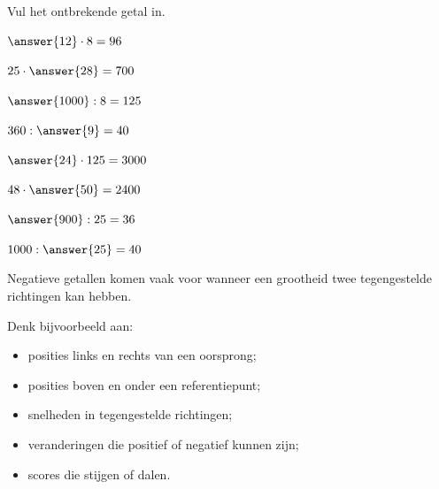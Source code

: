 \documentclass{ximera}
\begin{document}
\begin{oefening}{\oefU}

Vul het ontbrekende getal in.

\begin{question} \(\answer{12}\cdot8=96\) \end{question}

\begin{question} \(25\cdot\answer{28}=700\) \end{question}

\begin{question} \(\answer{1000}:8=125\) \end{question}

\begin{question} \(360:\answer{9}=40\) \end{question}

\begin{question} \(\answer{24}\cdot125=3000\) \end{question}

\begin{question} \(48\cdot\answer{50}=2400\) \end{question}

\begin{question} \(\answer{900}:25=36\) \end{question}

\begin{question} \(1000:\answer{25}=40\) \end{question}

\end{oefening}



Negatieve getallen komen vaak voor wanneer een grootheid twee tegengestelde
richtingen kan hebben.

Denk bijvoorbeeld aan:

\begin{itemize}
    \item posities links en rechts van een oorsprong;
    \item posities boven en onder een referentiepunt;
    \item snelheden in tegengestelde richtingen;
    \item veranderingen die positief of negatief kunnen zijn;
    \item scores die stijgen of dalen.
\end{itemize}
\end{document}

